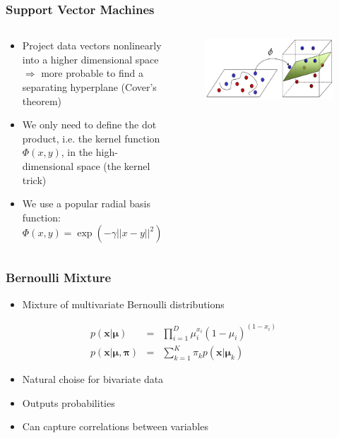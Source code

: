 \documentclass{beamer}
\begin{document}
\frame
{
  \frametitle{Support Vector Machines}

\begin{columns}
\begin{column}{7cm}
{\small
  \begin{itemize}
    \item Project data vectors nonlinearly into a higher dimensional space $\Rightarrow$ more probable to find a separating hyperplane (Cover's theorem)
    \item We only need to define the dot product, i.e. the kernel function $\Phi(x,y)$, in the high-dimensional space (the kernel trick)
    \item We use a popular radial basis function: $\Phi(x,y) = \exp(-\gamma||x-y||^2)$
  \end{itemize}
}
\end{column}
\begin{column}{4.5cm}
\begin{figure}
	\centering
		\includegraphics[width=\textwidth]{svm2.png}
	\label{fig:bridge}
\end{figure}
\end{column}
\end{columns}
}

\frame
{
  \frametitle{Bernoulli Mixture}

  \begin{itemize}
    \item Mixture of multivariate Bernoulli distributions
  \end{itemize}
  \begin{eqnarray*}
    p(\mathbf{x}|\boldsymbol\mu) &=& \prod_{i=1}^D \mu_i^{x_i}(1-\mu_i)^{(1-x_i)} \\
    p(\mathbf{x}|\boldsymbol\mu,\boldsymbol\pi) &=& \sum_{k=1}^K \pi_kp(\mathbf{x}|\boldsymbol\mu_k)
  \end{eqnarray*}
  \begin{itemize}
    \item Natural choise for bivariate data
    \item Outputs probabilities
    \item Can capture correlations between variables
  \end{itemize}

}
\end{document}
